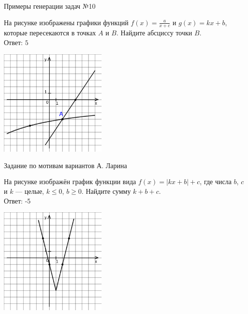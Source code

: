 \documentclass[aspectratio=169]{beamer}
\begin{document}
\begin{frame}{Примеры генерации задач №10}
    \begin{multicols}{2}
        На рисунке изображены графики функций $f(x)=\frac{a}{x+c}$ и $g(x)=kx+b$, которые пересекаются в точках $A$ и $B$. Найдите абсциссу точки $B$.\\

        Ответ: $5$

        \includegraphics[width=0.4\textwidth]{images/17222136364202n0.png}
    \end{multicols}
    

\end{frame}

\begin{frame}{Задание по мотивам вариантов А. Ларина}

    \begin{multicols}{2}
        На рисунке изображён график функции вида $f(x)=|kx+b|+c$, где числа $b$, $c$ и $k$ — целые, $k \leq 0$, $b\geq0$. Найдите сумму $k+b+c$.\\

        Ответ: -5

        \includegraphics[width=0.4\textwidth]{images/453912618511153n0.png}
    
    \end{multicols}
\end{frame}
\end{document}
